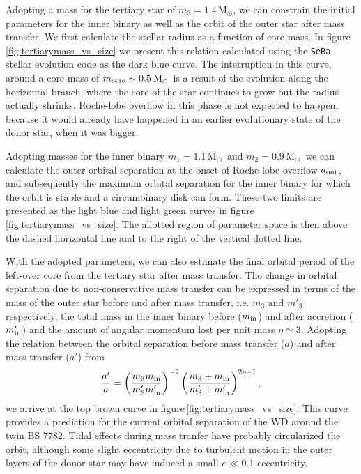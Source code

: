 \documentclass[twocolumn]{aastex62}
\newcommand{\MSun}{\mbox{M$_\odot$}}
\begin{document}
Adopting a mass for the tertiary star of $m_3 = 1.4$\,\MSun, we can
constrain the initial parameters for the inner binary as well as the
orbit of the outer star after mass transfer. We first calculate the
stellar radius as a function of core mass. In
figure\,\ref{fig:tertiarymass_vs_size} we present this relation
calculated using the {\tt SeBa} stellar evolution code
\citep{1996A&A...309..179P} as the dark blue curve.  The interruption
in this curve, around a core mass of $m_{\rm core} \sim 0.5$\,\MSun\,
is a result of the evolution along the horizontal branch, where the
core of the star continues to grow but the radius actually shrinks.
Roche-lobe overflow in this phase is not expected to happen, because
it would already have happened in an earlier evolutionary state of the
donor star, when it was bigger.

Adopting masses for the inner binary $m_1=1.1$\,\MSun\, and
$m_2=0.9$\,\MSun\, we can calculate the outer orbital separation at
the onset of Roche-lobe overflow $a_{\rm out}$, and subsequently the
maximum orbital separation for the inner binary for which the orbit is
stable and a circumbinary disk can form. These two limits are
presented as the light blue and light green curves in
figure\,\ref{fig:tertiarymass_vs_size}.  The allotted region of
parameter space is then above the dashed horizontal line and to the
right of the vertical dotted line.

With the adopted parameters, we can also estimate the final orbital
period of the left-over core from the tertiary star after 
mass transfer.  The change in orbital separation due to
non-conservative mass transfer can be expressed in terms of the mass
of the outer star before and after mass transfer, i.e. $m_3$ and $m'_3$
respectively, the total mass in the inner binary before ($m_{\rm in}$)
and after accretion ($m'_{\rm in}$) and the amount of angular momentum
lost per unit mass $\eta \simeq 3$. Adopting the relation between the
orbital separation before mass transfer ($a$) and after mass transfer
($a'$) from \cite{1995A&A...296..691P}
\begin{equation}
  {a' \over a} = \left( {m_3 m_{\rm in} \over m'_3 m'_{\rm in}} \right)^{-2}
  \left( {m_3 + m_{\rm in} \over m'_3 + m'_{\rm in}} \right)^{2\eta + 1},
\end{equation}
we arrive at the top brown curve in
figure\,\ref{fig:tertiarymass_vs_size}. This curve provides a prediction for 
the current orbital separation of the WD around the twin
BS 7782. Tidal effects during mass tranfer
have probably circularized the orbit, although some slight eccentricity
due to turbulent motion in the outer layers of the donor star may have
induced a small $e \ll 0.1$ eccentricity.
\end{document}
